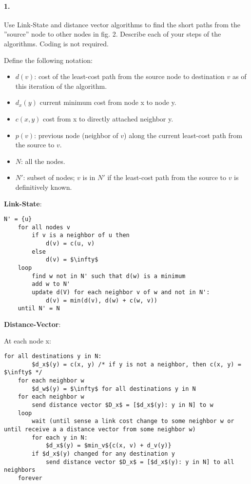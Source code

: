 \documentclass{article}
\begin{document}
\paragraph{1.} Use Link-State and distance vector algorithms to find the short paths from the ”source” node to other nodes in fig. 2. Describe each of your steps of the algorithms. Coding is not required.

Define the following notation:

\begin{itemize}
    \item $d(v)$: cost of the least-cost path from the source node to destination $v$ as of this iteration of the algorithm.
    \item $d_x(y)$ current minimum cost from node x to node y.
    \item $c(x, y)$ cost from x to directly attached neighbor y.
    \item $p(v)$: previous node (neighbor of $v$) along the current least-cost path from the source to $v$.
    \item $N$: all the nodes.
    \item $N'$: subset of nodes; $v$ is in $N'$ if the least-cost path from the source to $v$ is definitively known.
\end{itemize}

\textbf{Link-State}: 

\begin{lstlisting}[mathescape=true]
    N' = {u}
    for all nodes v
        if v is a neighbor of u then
            d(v) = c(u, v)
        else 
            d(v) = $\infty$
    loop
        find w not in N' such that d(w) is a minimum
        add w to N'
        update d(V) for each neighbor v of w and not in N':
            d(v) = min(d(v), d(w) + c(w, v))
    until N' = N
\end{lstlisting}

\textbf{Distance-Vector}:

At each node x:
\begin{lstlisting}[mathescape=true]
    for all destinations y in N:
        $d_x$(y) = c(x, y) /* if y is not a neighbor, then c(x, y) = $\infty$ */
    for each neighbor w
        $d_w$(y) = $\infty$ for all destinations y in N
    for each neighbor w
        send distance vector $D_x$ = [$d_x$(y): y in N] to w
    loop
        wait (until sense a link cost change to some neighbor w or until receive a a distance vector from some neighbor w)
        for each y in N:
            $d_x$(y) = $min_v${c(x, v) + d_v(y)}
        if $d_x$(y) changed for any destination y
            send distance vector $D_x$ = [$d_x$(y): y in N] to all neighbors
    forever
\end{lstlisting}
\end{document}
